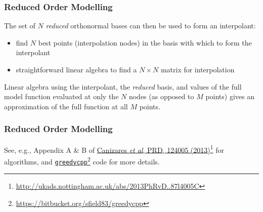 \begin{frame}

\frametitle{Reduced Order Modelling}
\label{reducedordermodelling}

The set of $N$ \emph{reduced} orthonormal bases can then be used to form an interpolant:

\begin{itemize}
\item find $N$ best points (interpolation nodes) in the basis with which to form the interpolant

\item straightforward linear algebra to find a $N\times N$ matrix for interpolation

\end{itemize}

Linear algebra using the interpolant, the \emph{reduced} basis, and values of the full model function evaluated at only
the $N$ nodes (as opposed to $M$ points) gives an approximation of the full function at all $M$ points.

\end{frame}

\begin{frame}

\frametitle{Reduced Order Modelling}
\label{reducedordermodelling}

See, e.g., Appendix A \& B of \href{http://ukads.nottingham.ac.uk/abs/2013PhRvD..87l4005C}{Canizares \emph{et al}, PRD, 124005 (2013)}\footnote{\href{http://ukads.nottingham.ac.uk/abs/2013PhRvD..87l4005C}{http:/\slash ukads.nottingham.ac.uk\slash abs\slash 2013PhRvD..87l4005C}} for algorithms,
and \href{https://bitbucket.org/sfield83/greedycpp}{\texttt{greedycpp}}\footnote{\href{https://bitbucket.org/sfield83/greedycpp}{https:/\slash bitbucket.org\slash sfield83\slash greedycpp}} code for more details.

\end{frame}

